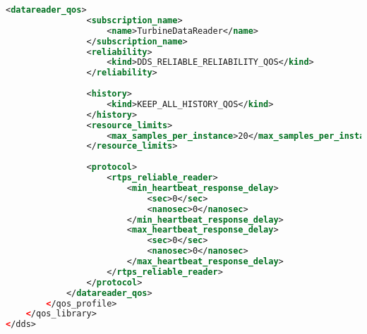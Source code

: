 \begin{lstlisting}[language=XML]
			<datareader_qos>
				<subscription_name>
					<name>TurbineDataReader</name>
				</subscription_name>
				<reliability>
					<kind>DDS_RELIABLE_RELIABILITY_QOS</kind>
				</reliability>
				
				<history>
					<kind>KEEP_ALL_HISTORY_QOS</kind>
				</history>
				<resource_limits>
					<max_samples_per_instance>20</max_samples_per_instance>
				</resource_limits>
				
				<protocol>
					<rtps_reliable_reader>
						<min_heartbeat_response_delay>
							<sec>0</sec>
							<nanosec>0</nanosec>
						</min_heartbeat_response_delay>
						<max_heartbeat_response_delay>
							<sec>0</sec>
							<nanosec>0</nanosec>
						</max_heartbeat_response_delay>
					</rtps_reliable_reader>
				</protocol>
			</datareader_qos>
		</qos_profile>
	</qos_library>
</dds>
\end{lstlisting}

